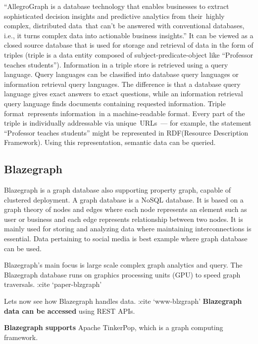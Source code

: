      ``AllegroGraph is a database technology that enables businesses to
     extract sophisticated decision insights and predictive analytics
     from their highly complex, distributed data that can’t be
     answered with conventional databases, i.e., it turns complex data
     into actionable business insights.'' \cite{www-Allegro} It can be
     viewed as a closed source database that is used for storage and
     retrieval of data in the form of triples (triple is a data entity
     composed of subject-predicate-object like ``Professor teaches
     students'').  Information in a triple store is retrieved using a
     query language. Query languages can be classified into database
     query languages or information retrieval query languages. The
     difference is that a database query language gives exact answers
     to exact questions, while an information retrieval query language
     finds documents containing requested information.  Triple
     format represents information in a machine-readable format.
     Every part of the triple is individually addressable via
     unique URLs — for example, the statement ``Professor teaches
     students'' might be represented in RDF(Resource Description
     Framework). Using this representation, semantic data
     can be queried.  \cite{www-Allegrow}

\subsection{Blazegraph}

     Blazegraph is a graph database also supporting property graph, 
     capable of clustered deployment. A graph database is a NoSQL 
     database. It is based on a graph theory of nodes and edges where 
     each node represents an element such as user or business and each 
     edge represents relationship between two nodes. It is mainly used 
     for storing and analyzing data where maintaining interconnections 
     is essential. Data pertaining to social media is best example where 
     graph database can be used.

     Blazegraph’s main focus is large scale complex graph analytics and query. 
     The Blazegraph database runs on graphics processing units (GPU) to 
     speed graph traversals. :cite ‘paper-blzgraph’

     Lets now see how Blazegraph handles data. :cite ‘www-blzgraph’ 
     {\bf Blazegraph data can be accessed} using REST APIs. 

     {\bf Blazegraph supports} Apache TinkerPop, which is a graph
      computing framework.

